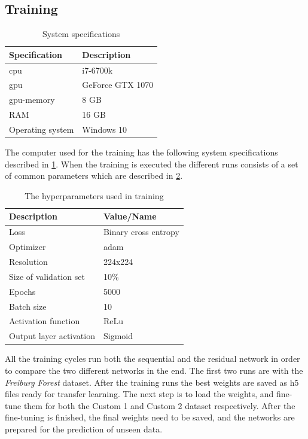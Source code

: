 \documentclass[USenglish]{ifimaster}  %
\begin{document}
\subsection{Training}

\begin{table}[ht]
\centering
\begin{tabular}{ll}
\hline
\textbf{Specification} & \textbf{Description} \\ \hline
\ac{cpu} & i7-6700k \\
\ac{gpu} & GeForce GTX 1070  \\
\ac{gpu}-memory & 8 GB  \\
RAM & 16 GB \\
Operating system & Windows 10  \\ \hline
\end{tabular}
\caption{System specifications}
\label{table:system_spec}
\end{table}

The computer used for the training has the following system specifications described in \cref{table:system_spec}.
When the training is executed the different runs consists of a set of common parameters which are described in \cref{table:hyperparameters}. 

\begin{table}[ht]
\centering
\begin{tabular}{ll}
\hline
\textbf{Description} & \textbf{Value/Name}  \\ \hline
Loss &  Binary cross entropy\\
Optimizer &  adam \\
Resolution & 224x224 \\
Size of validation set & 10\%  \\
Epochs &  5000 \\ 
Batch size & 10\\
Activation function & ReLu\\
Output layer activation & Sigmoid \\ \hline
\end{tabular}
\caption{The hyperparameters used in training}
\label{table:hyperparameters}
\end{table}

All the training cycles run both the sequential and the residual network in order to compare the two different networks in the end. The first two runs are with the \textit{Freiburg Forest} dataset. After the training runs the best weights are saved as h5 files ready for transfer learning. The next step is to load the weights, and fine-tune them for both the Custom 1 and Custom 2 dataset respectively. After the fine-tuning is finished, the final weights need to be saved, and the networks are prepared for the prediction of unseen data. 
\end{document}
